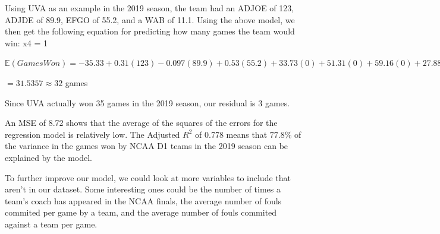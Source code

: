 \documentclass{article}
\begin{document}
Using UVA as an example in the 2019 season, the team had an ADJOE of 123, ADJDE of 89.9, EFGO of 55.2, and a WAB of 11.1. Using the above model, we then get the following equation for predicting how many games the team would win: x4 = 1

$\mathbb{E}(Games Won) = -35.33 + 0.31(123) - 0.097(89.9) + 0.53(55.2) + 33.73(0) + 51.31(0) + 59.16(0) + 27.88(1) - 0.32(0) - 0.44(0) - 0.47(0) - 0.16(123 *1)$ 

$ = 31.5357 \approx 32$ games

Since UVA actually won 35 games in the 2019 season, our residual is 3 games. 

An MSE of 8.72 shows that the average of the squares of the errors for the regression model is relatively low. The Adjusted $R^2$ of 0.778 means that $77.8\%$ of the variance in the games won by NCAA D1 teams in the 2019 season can be explained by the model.

To further improve our model, we could look at more variables to include that aren't in our dataset. Some interesting ones could be the number of times a team's coach has appeared in the NCAA finals, the average number of fouls commited per game by a team, and the average number of fouls commited against a team per game.
\end{document}
